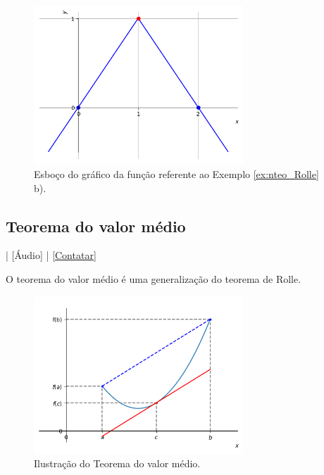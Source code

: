 \begin{ex}
\begin{enumerate}[a)]
  \begin{figure}[H]
    \centering
    \includegraphics[width=0.7\textwidth]{./cap_apderiv/dados/fig_ex_nteo_Rolle_nderiv/fig_ex_nteo_Rolle_nderiv}
    \caption{Esboço do gráfico da função referente ao Exemplo \ref{ex:nteo_Rolle} b).}
    \label{fig:ex_nteo_Rolle_nderiv}
  \end{figure}  
  \end{enumerate}
\end{ex}

\subsection{Teorema do valor médio}

\begin{flushright}
  [Vídeo] | [Áudio] | \href{https://phkonzen.github.io/notas/contato.html}{[Contatar]}
\end{flushright}

O teorema do valor médio é uma generalização do teorema de Rolle.

\begin{figure}[H]
  \centering
  \includegraphics[width=0.7\textwidth]{./cap_apderiv/dados/fig_teo_valmed/fig_teo_valmed}
  \caption{Ilustração do Teorema do valor médio.}
  \label{fig:teo_valor_medio}
\end{figure}

